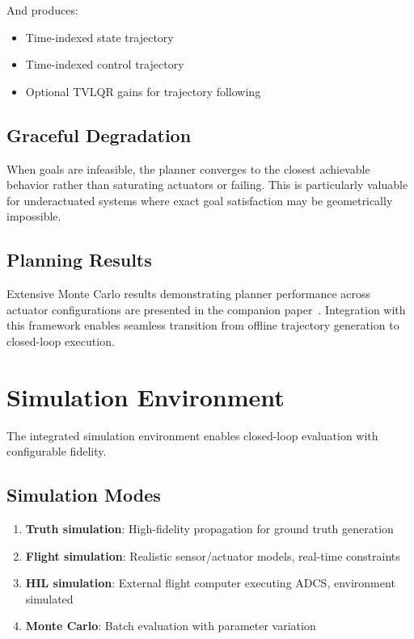 \documentclass[conference]{IEEEtran}
\begin{document}
And produces:
\begin{itemize}
    \item Time-indexed state trajectory
    \item Time-indexed control trajectory
    \item Optional TVLQR gains for trajectory following
\end{itemize}

\subsection{Graceful Degradation}\label{subsec:graceful}

When goals are infeasible, the planner converges to the closest achievable behavior rather than saturating actuators or failing. This is particularly valuable for underactuated systems where exact goal satisfaction may be geometrically impossible.

\subsection{Planning Results}\label{subsec:planning_results}

Extensive Monte Carlo results demonstrating planner performance across actuator configurations are presented in the companion paper~\cite{mckeen_planner_2026}. Integration with this framework enables seamless transition from offline trajectory generation to closed-loop execution.


\section{Simulation Environment}\label{sec:simulation}

The integrated simulation environment enables closed-loop evaluation with configurable fidelity.

\subsection{Simulation Modes}\label{subsec:sim_modes}

\begin{enumerate}
    \item \textbf{Truth simulation}: High-fidelity propagation for ground truth generation
    \item \textbf{Flight simulation}: Realistic sensor/actuator models, real-time constraints
    \item \textbf{HIL simulation}: External flight computer executing ADCS, environment simulated
    \item \textbf{Monte Carlo}: Batch evaluation with parameter variation
\end{enumerate}
\end{document}
